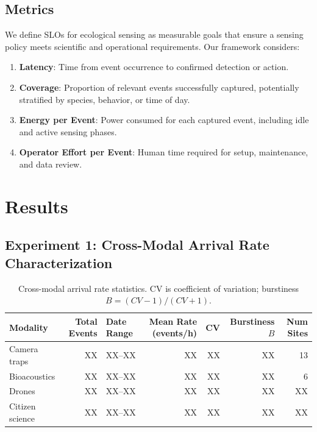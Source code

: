 \documentclass[letterpaper,twocolumn,10pt]{article}
\begin{document}
\subsection{Metrics}
\label{sec:slo}
We define SLOs for ecological sensing as measurable goals that ensure a sensing policy meets scientific and operational requirements. Our framework considers:
\begin{enumerate}
    \item \textbf{Latency}: Time from event occurrence to confirmed detection or action.
    \item \textbf{Coverage}: Proportion of relevant events successfully captured, potentially stratified by species, behavior, or time of day.
    \item \textbf{Energy per Event}: Power consumed for each captured event, including idle and active sensing phases.
    \item \textbf{Operator Effort per Event}: Human time required for setup, maintenance, and data review.
\end{enumerate}

\section{Results}
\label{sec:results}

\subsection{Experiment 1: Cross-Modal Arrival Rate Characterization}


\begin{table}[t]
\centering
\begin{tabular}{p{2.5cm} r p{2.5cm} r r r r}
\toprule
\textbf{Modality} & \textbf{Total Events} & \textbf{Date Range} & \textbf{Mean Rate (events/h)} & \textbf{CV} & \textbf{Burstiness $B$} & \textbf{Num Sites} \\
\midrule
Camera traps & XX & XX--XX & XX & XX & XX & 13 \\
Bioacoustics & XX & XX--XX & XX & XX & XX & 6 \\
Drones & XX & XX--XX & XX & XX & XX & XX \\
Citizen science & XX & XX--XX & XX & XX & XX & XX \\
\bottomrule
\end{tabular}
\caption{Cross-modal arrival rate statistics. CV is coefficient of variation; burstiness $B = (CV - 1)/(CV + 1)$.}
\label{table:arrival_rates}
\end{table}
\end{document}
